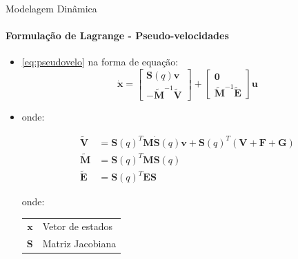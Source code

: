 \documentclass[aspectratio=169]{beamer}
\begin{document}
\begin{frame}{Modelagem Dinâmica}
    \framesubtitle{Formulação de Lagrange - Pseudo-velocidades}
    \begin{itemize}
        \item \eqref{eq:pseudovelo} na forma de equação:
              \begin{equation*}
                  \mathbf{\dot{x}} =
                  \begin{bmatrix}
                      \mathbf{S}(q)\mathbf{v} \\
                      \mathbf{-\tilde{M}}^{-1}\mathbf{\tilde{V}}
                  \end{bmatrix}
                  +
                  \begin{bmatrix}
                      \mathbf{0} \\
                      \mathbf{\tilde{M}}^{-1}\mathbf{\tilde{E}}
                  \end{bmatrix} \mathbf{u}
              \end{equation*}

        \item onde:

              \begin{equation*}
                  \begin{split}
                      \mathbf{\tilde{V}} & =
                      \mathbf{S}(q)^T\mathbf{M}\mathbf{\dot{S}}(q)\mathbf{v} + \mathbf{S}(q)^T (\mathbf{V + F + G})\\
                      \mathbf{\tilde{M}} & = \mathbf{S}(q)^T\mathbf{M}\mathbf{S}(q)\\
                      \mathbf{\tilde{E}} & = \mathbf{S}(q)^T\mathbf{E}\mathbf{S}
                  \end{split}
              \end{equation*}

              \begin{block}{}
                  \scriptsize{
                      onde:
                      \begin{tabular}{ r | l }
                          $\mathbf{x}$ & Vetor de estados \\
                          $\mathbf{S}$ & Matriz Jacobiana \\
                      \end{tabular}}
              \end{block}


    \end{itemize}
\end{frame}
\end{document}
